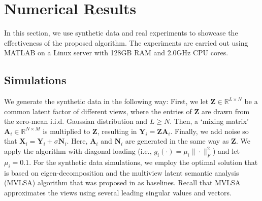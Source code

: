 \documentclass[10pt,journal]{IEEEtran}
\begin{document}
\section{Numerical Results}

In this section, we use synthetic data and real experiments to showcase the effectiveness of the proposed algorithm.
The experiments are carried out using {MATLAB} on a Linux server with 128GB RAM and 2.0GHz CPU cores.

\subsection{Simulations}
We generate the synthetic data in the following way: First, we let ${\bm Z}\in\mathbb{R}^{L\times N}$ be a common latent factor of different views,
where the entries of ${\bm Z}$ are drawn from the zero-mean i.i.d. Gaussian distribution and $L\geq N$.
Then, a `mixing matrix' ${\bm A}_i\in\mathbb{R}^{N\times M}$ is multiplied to ${\bm Z}$, resulting in ${\bm Y}_i={\bm Z}{\bm A}_i$.
Finally, we add noise so that ${\bm X}_i={\bm Y}_i + \sigma{\bm N}_i$.
Here, ${\bm A}_i$ and ${\bm N}_i$ are generated in the same way as ${\bm Z}$.
We apply the algorithm with diagonal loading (i.e., $g_i(\cdot)=\mu_i\|\cdot\|_F^2$) and let $\mu_i=0.1$.
For the synthetic data simulations, we employ the optimal solution that is based on eigen-decomposition
and the multiview latent semantic analysis (MVLSA) algorithm that was proposed in \cite{rastogimultiview} as baselines. 
Recall that MVLSA approximates the views using several leading singular values and vectors.
\end{document}
